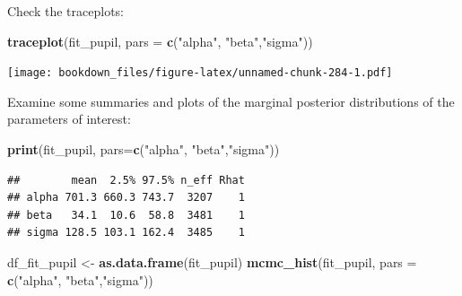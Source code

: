 \documentclass[12pt,]{krantz}
\newenvironment{Shaded}{\begin{snugshade}}{\end{snugshade}}
\newcommand{\DataTypeTok}[1]{\textcolor[rgb]{0.13,0.29,0.53}{#1}}
\newcommand{\KeywordTok}[1]{\textcolor[rgb]{0.13,0.29,0.53}{\textbf{#1}}}
\newcommand{\NormalTok}[1]{#1}
\newcommand{\OperatorTok}[1]{\textcolor[rgb]{0.81,0.36,0.00}{\textbf{#1}}}
\newcommand{\StringTok}[1]{\textcolor[rgb]{0.31,0.60,0.02}{#1}}
\theoremstyle{definition}
\theoremstyle{definition}
\theoremstyle{definition}
\theoremstyle{remark}
\begin{document}
\begin{Shaded}
\end{Shaded}

Check the traceplots:

\begin{Shaded}
\begin{Highlighting}[]
\KeywordTok{traceplot}\NormalTok{(fit_pupil, }\DataTypeTok{pars =} \KeywordTok{c}\NormalTok{(}\StringTok{"alpha"}\NormalTok{, }\StringTok{"beta"}\NormalTok{,}\StringTok{"sigma"}\NormalTok{))}
\end{Highlighting}
\end{Shaded}

\texttt{[image: bookdown\_files/figure-latex/unnamed-chunk-284-1.pdf]}

Examine some summaries and plots of the marginal posterior distributions of the parameters of interest:

\begin{Shaded}
\begin{Highlighting}[]
\KeywordTok{print}\NormalTok{(fit_pupil, }\DataTypeTok{pars=}\KeywordTok{c}\NormalTok{(}\StringTok{"alpha"}\NormalTok{, }\StringTok{"beta"}\NormalTok{,}\StringTok{"sigma"}\NormalTok{))}
\end{Highlighting}
\end{Shaded}

\begin{verbatim}
##        mean  2.5% 97.5% n_eff Rhat
## alpha 701.3 660.3 743.7  3207    1
## beta   34.1  10.6  58.8  3481    1
## sigma 128.5 103.1 162.4  3485    1
\end{verbatim}

\begin{Shaded}
\begin{Highlighting}[]
\NormalTok{df_fit_pupil <-}\StringTok{ }\KeywordTok{as.data.frame}\NormalTok{(fit_pupil)}
\KeywordTok{mcmc_hist}\NormalTok{(fit_pupil, }\DataTypeTok{pars =} \KeywordTok{c}\NormalTok{(}\StringTok{"alpha"}\NormalTok{, }\StringTok{"beta"}\NormalTok{,}\StringTok{"sigma"}\NormalTok{)) }
\end{Highlighting}
\end{Shaded}
\end{document}
